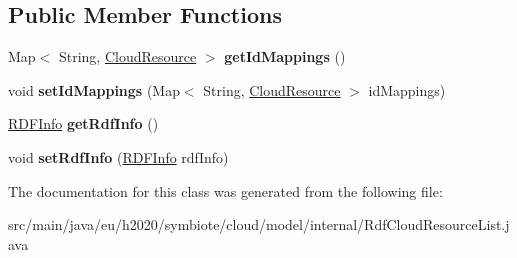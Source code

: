 \subsection*{Public Member Functions}
\begin{DoxyCompactItemize}
\item 
\mbox{\label{classeu_1_1h2020_1_1symbiote_1_1cloud_1_1model_1_1internal_1_1RdfCloudResourceList_ad9b8556c5ca08629e34ac7139454e2c3}} 
Map$<$ String, \hyperlink{classeu_1_1h2020_1_1symbiote_1_1cloud_1_1model_1_1internal_1_1CloudResource}{Cloud\+Resource} $>$ {\bfseries get\+Id\+Mappings} ()
\item 
\mbox{\label{classeu_1_1h2020_1_1symbiote_1_1cloud_1_1model_1_1internal_1_1RdfCloudResourceList_ac489ec60aef8a5402c7c1b198e7affdc}} 
void {\bfseries set\+Id\+Mappings} (Map$<$ String, \hyperlink{classeu_1_1h2020_1_1symbiote_1_1cloud_1_1model_1_1internal_1_1CloudResource}{Cloud\+Resource} $>$ id\+Mappings)
\item 
\mbox{\label{classeu_1_1h2020_1_1symbiote_1_1cloud_1_1model_1_1internal_1_1RdfCloudResourceList_a1b1f6aaaa3573892eef65cbd4d1fbae0}} 
\hyperlink{classeu_1_1h2020_1_1symbiote_1_1core_1_1internal_1_1RDFInfo}{R\+D\+F\+Info} {\bfseries get\+Rdf\+Info} ()
\item 
\mbox{\label{classeu_1_1h2020_1_1symbiote_1_1cloud_1_1model_1_1internal_1_1RdfCloudResourceList_af7e7d7044e76408c26b7b6926b90ea19}} 
void {\bfseries set\+Rdf\+Info} (\hyperlink{classeu_1_1h2020_1_1symbiote_1_1core_1_1internal_1_1RDFInfo}{R\+D\+F\+Info} rdf\+Info)
\end{DoxyCompactItemize}


The documentation for this class was generated from the following file\+:\begin{DoxyCompactItemize}
\item 
src/main/java/eu/h2020/symbiote/cloud/model/internal/Rdf\+Cloud\+Resource\+List.\+java\end{DoxyCompactItemize}
